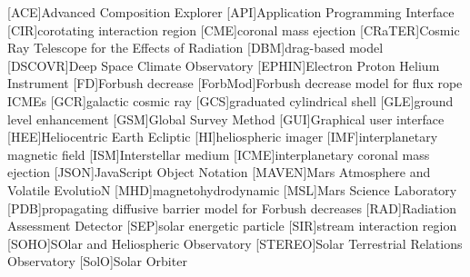 	\begin{acronym}
	[ACE]{Advanced Composition Explorer}
	[API]{Application Programming Interface}
	[CIR]{corotating interaction region}
	[CME]{coronal mass ejection}
	[CRaTER]{Cosmic Ray Telescope for the Effects of Radiation}
	[DBM]{drag-based model}
	[DSCOVR]{Deep Space Climate Observatory}
	[EPHIN]{Electron Proton Helium Instrument}
	[FD]{Forbush decrease}
	[ForbMod]{Forbush decrease model for flux rope ICMEs \cite{Dumbovic2018-ForbMod}}
	[GCR]{galactic cosmic ray}
	[GCS]{graduated cylindrical shell}
	[GLE]{ground level enhancement}
	[GSM]{Global Survey Method \cite{Belov-2005-GSM}}
	[GUI]{Graphical user interface}
	[HEE]{Heliocentric Earth Ecliptic}
	[HI]{heliospheric imager}
	[IMF]{interplanetary magnetic field}
    [ISM]{Interstellar medium}
	[ICME]{interplanetary coronal mass ejection}
	[JSON]{JavaScript Object Notation}
	[MAVEN]{Mars Atmosphere and Volatile EvolutioN}
	[MHD]{magnetohydrodynamic}
	[MSL]{Mars Science Laboratory}
	[PDB]{propagating diffusive barrier model for Forbush decreases \cite{Wibberenz-1998}}
	[RAD]{Radiation Assessment Detector}
	[SEP]{solar energetic particle}
	[SIR]{stream interaction region}
	[SOHO]{SOlar and Heliospheric Observatory}
	[STEREO]{Solar Terrestrial Relations Observatory}
	[SolO]{Solar Orbiter}
	\end{acronym}
	

\endgroup

\cleardoublepage